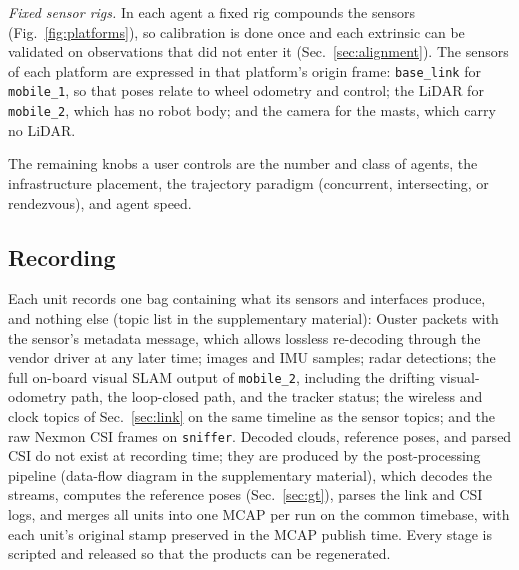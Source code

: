 \emph{Fixed sensor rigs.} In each agent a fixed rig compounds the
sensors (Fig.~\ref{fig:platforms}), so calibration is done once and
each extrinsic can be validated on observations that did not enter it
(Sec.~\ref{sec:alignment}). The sensors of each platform are expressed
in that platform's origin frame: \texttt{base\_link} for
\texttt{mobile\_1}, so that poses relate to wheel odometry and control;
the LiDAR for \texttt{mobile\_2}, which has no robot body; and the
camera for the masts, which carry no LiDAR.

The remaining knobs a user controls are the number and class of
agents, the infrastructure placement, the trajectory paradigm
(concurrent, intersecting, or rendezvous), and agent speed.

\subsection{Recording}
\label{sec:recording}
Each unit records one bag containing what its sensors and interfaces
produce, and nothing else (topic list in the supplementary material): Ouster packets
with the sensor's metadata message, which allows lossless re-decoding
through the vendor driver at any later time; images and IMU samples;
radar detections; the full on-board visual SLAM output of
\texttt{mobile\_2}, including the drifting visual-odometry path, the
loop-closed path, and the tracker status; the wireless and clock topics
of Sec.~\ref{sec:link} on the same timeline as the sensor topics; and
the raw Nexmon CSI frames on \texttt{sniffer}. Decoded clouds,
reference poses, and parsed CSI do not exist at recording time; they
are produced by the post-processing pipeline (data-flow diagram in the
supplementary material), which decodes the streams, computes the reference poses
(Sec.~\ref{sec:gt}), parses the link and CSI logs, and merges all units
into one MCAP per run on the common timebase, with each unit's original
stamp preserved in the MCAP publish time. Every stage is scripted and
released so that the products can be regenerated.

